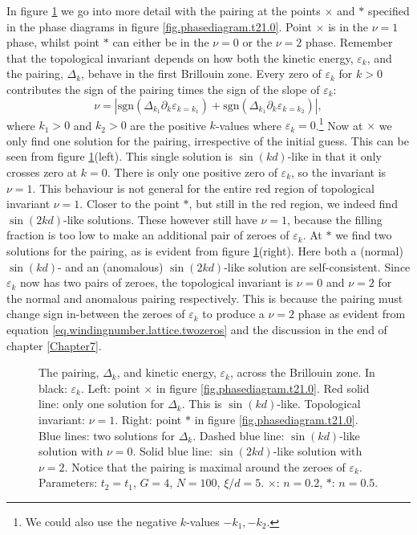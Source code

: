 In figure \ref{fig.Deltaexamples.t21.0} we go into more detail with the pairing at the points $\times$ and $*$ specified in the phase diagrams in figure \ref{fig.phasediagram.t21.0}. Point $\times$ is in the $\nu = 1$ phase, whilst point $*$ can either be in the $\nu = 0$ or the $\nu = 2$ phase. Remember that the topological invariant depends on how both the kinetic energy, $\varepsilon_k$, and the pairing, $\Delta_k$, behave in the first Brillouin zone. Every zero of $\varepsilon_k$ for $k > 0$ contributes the sign of the pairing times the sign of the slope of $\varepsilon_k$:
\begin{equation}
\nu = \left| \text{sgn}\left(\Delta_{k_1}\partial_k\varepsilon_{k = k_1}\right) + \text{sgn}\left(\Delta_{k_1}\partial_k\varepsilon_{k = k_2}\right)\right|, 
\label{eq.windingnumber.lattice.twozeros}
\end{equation}
where $k_1 > 0$ and $k_2 > 0$ are the positive $k$-values where $\varepsilon_k = 0$.\footnote{We could also use the negative $k$-values $-k_1, -k_2$.} Now at $\times$ we only find one solution for the pairing, irrespective of the initial guess. This can be seen from figure \ref{fig.Deltaexamples.t21.0}(left). This single solution is $\sin(kd)$-like in that it only crosses zero at $k = 0$. There is only one positive zero of $\varepsilon_k$, so the invariant is $\nu = 1$. This behaviour is not general for the entire red region of topological invariant $\nu = 1$. Closer to the point $*$, but still in the red region, we indeed find $\sin(2kd)$-like solutions. These however still have $\nu = 1$, because the filling fraction is too low to make an additional pair of zeroes of $\varepsilon_k$. At $*$ we find two solutions for the pairing, as is evident from figure \ref{fig.Deltaexamples.t21.0}(right). Here both a (normal) $\sin(kd)$- and an (anomalous) $\sin(2kd)$-like solution are self-consistent. Since $\varepsilon_k$ now has two pairs of zeroes, the topological invariant is $\nu = 0$ and $\nu = 2$ for the normal and anomalous pairing respectively. This is because the pairing must change sign in-between the zeroes of $\varepsilon_k$ to produce a $\nu = 2$ phase as evident from equation \eqref{eq.windingnumber.lattice.twozeros} and the discussion in the end of chapter \ref{Chapter7}. 

\begin{figure}
\begin{center}

\caption{The pairing, $\Delta_k$, and kinetic energy, $\varepsilon_k$, across the Brillouin zone. In black: $\varepsilon_k$. Left: point $\times$ in figure \ref{fig.phasediagram.t21.0}. Red solid line: only one solution for $\Delta_k$. This is $\sin(kd)$-like. Topological invariant: $\nu = 1$. Right: point $*$ in figure \ref{fig.phasediagram.t21.0}. Blue lines: two solutions for $\Delta_k$. Dashed blue line: $\sin(kd)$-like solution with $\nu = 0$. Solid blue line: $\sin(2kd)$-like solution with $\nu = 2$. Notice that the pairing is maximal around the zeroes of $\varepsilon_k$. Parameters: $t_2 = t_1$, $G = 4$, $N = 100$, $\xi / d = 5$. $\times$: $n = 0.2$, $*$: $n = 0.5$.}
\label{fig.Deltaexamples.t21.0}
\end{center}
\end{figure}

